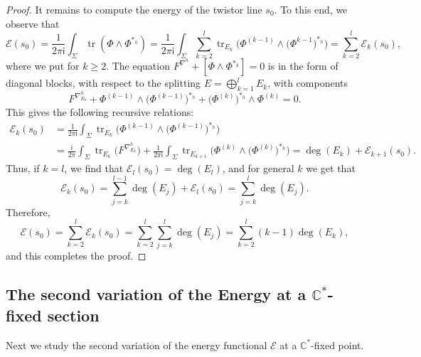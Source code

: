 \documentclass[pdftex]{sigma}
\numberwithin{equation}{section}
\theoremstyle{definition}
\newcommand\C{{\mathbb C}}
\renewcommand{\i}{\mathsf{i}}
\begin{document}
\begin{proof}
It remains to compute the energy of the twistor line $s_0$. To this end, we observe that
\[
\mathcal{E}(s_0) = \frac{1}{2\pi \i}\int_\Sigma \operatorname{tr}(\Phi\wedge \Phi^{*_h}) =
 \frac{1}{2\pi \i}\int_\Sigma\sum_{k=2}^l \operatorname{tr}_{E_k}\bigl(\Phi^{(k-1)}\wedge \bigl(\Phi^{k-1}\bigr)^{*_h}\bigr)
 = \sum_{k=2}^l\mathcal E_k(s_0),
\]
where we put \smash{$\mathcal E_k(s_0) =
\frac{1}{2\pi \i}\int_\Sigma \operatorname{tr}_{E_k}\bigl(\Phi^{(k-1)}\wedge \bigl(\Phi^{k-1}\bigr)^{*_h}\bigr)$}
for $k \geq 2$.
The equation $F^{\nabla^h} + {[\Phi\wedge\Phi^{*_h}] = 0}$ is in the form of diagonal blocks, with respect
to the splitting $E = \bigoplus_{k=1}^lE_k$, with components
\[
F^{\nabla^h_{E_k}} + \Phi^{(k-1)}\wedge \bigl(\Phi^{(k-1)}\bigr)^{*_h} + \bigl(\Phi^{(k)}\bigr)^{*_h}\wedge \Phi^{(k)} = 0.
\]
This gives the following recursive relations:
\begin{align*}
\mathcal E_k(s_0) & = \frac{1}{2\pi \i}\int_\Sigma\operatorname{tr}_{E_k}\bigl(\Phi^{(k-1)}\wedge \bigl(\Phi^{(k-1)}\bigr)^{*_h}\bigr)\\
&= \frac{\i}{2\pi}\int_\Sigma\operatorname{tr}_{E_k}\bigl(F^{\nabla^h_{E_k}}\bigr) +\frac{1}{2\pi \i}\int_\Sigma\operatorname{tr}_{E_{k+1}}\bigl(\Phi^{(k)}\wedge\bigl(\Phi^{(k)}\bigr)^{*_h}\bigr)= \deg(E_k) + \mathcal E_{k+1}(s_0).
\end{align*}
Thus, if $k = l$, we find that
$
\mathcal E_l(s_0) = \deg(E_l) $,
and for general $k$ we get that
\[
\mathcal E_k(s_0) = \sum_{j=k}^{l-1}\deg(E_j) + \mathcal E_l(s_0) = \sum_{j=k}^l\deg(E_j).
\]
Therefore,
\[
\mathcal E(s_0) = \sum_{k=2}^l\mathcal E_k(s_0) = \sum_{k=2}^l\sum_{j=k}^l\deg(E_j)
 = \sum_{k=2}^l(k-1)\deg(E_k),
\]
and this completes the proof.
\end{proof}

\subsection[The second variation of the Energy at a C\^{}*-fixed section]{The second variation of the Energy at a $\boldsymbol{\C^*}$-fixed section}

Next we study the second variation of the energy functional $\mathcal E$ at a $\C^*$-fixed point.
\end{document}

